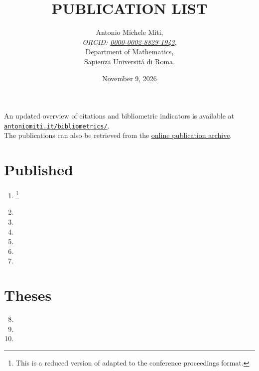 \documentclass[a4paper]{article}
\title{PUBLICATION LIST}
\date{November 9, 2026}
\author{
  Antonio Michele Miti,\\
  \emph{ORCID: \href{https://orcid.org/0000-0002-8829-1943}{0000-0002-8829-1943}},\\
  Department of Mathematics,\\
  Sapienza Universit\'a di Roma.
}
\begin{document}
\maketitle

\noindent
An updated overview of citations and bibliometric indicators is available at
\href{https://antoniomiti.it/bibliometrics/}{\texttt{antoniomiti.it/bibliometrics/}}.
\\
The publications can also be retrieved from the
\href{https://www.dropbox.com/sh/asop74adf1c0gbi/AADDEeq-8XCf3IISOMzrlbroa?dl=0}{online publication archive}.

\section*{Published}

\begin{enumerate}
  \setcounter{enumi}{0}


  \item {}\footnote{This is a reduced version of \cite{Luongo2024} adapted to the conference proceedings format.}

  \item {}

  \item {}

  \item {}

  \item {}

  \item {}

  \item {}


\end{enumerate}


\section*{Theses}

\begin{enumerate}
  \setcounter{enumi}{7}


  \item {}

  \item {}

  \item {}


\end{enumerate}
\end{document}
